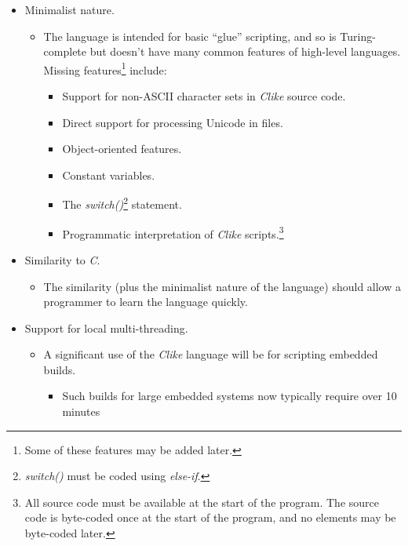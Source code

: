 \begin{itemize}
   \item Minimalist nature.
         \begin{itemize}
            \item The language is intended for basic ``glue'' scripting, and so is Turing-complete
                  but doesn't have many common features of high-level languages.
                  Missing features\footnote{Some of these features may be added later.}
                  include:
                  \begin{itemize}
                     \item Support for non-ASCII character sets in \emph{Clike} source code.
                     \item Direct support for processing Unicode in files.
                     \item Object-oriented features.
                     \item Constant variables.
                     \item The \emph{switch()}\footnote{\emph{switch()} must be coded using
                           \emph{else-if}.} statement.
                     \item Programmatic interpretation of \emph{Clike} scripts.\footnote{All source code
                           must be available at the start of the program.  The source code is byte-coded
                           once at the start of the program, and no elements may be byte-coded later.}
                  \end{itemize}
         \end{itemize}
   \item Similarity to
         \emph{C}.
         \begin{itemize}
            \item The similarity (plus the minimalist nature of the language) should allow
                  a programmer to learn the language quickly.
         \end{itemize}
   \item Support for local multi-threading.
      \begin{itemize}
         \item A significant use of the \emph{Clike} language will be for scripting embedded
               builds.
               \begin{itemize}
                  \item Such builds for large embedded systems now typically require over 10 minutes

\end{itemize}
\end{itemize}
\end{itemize}
